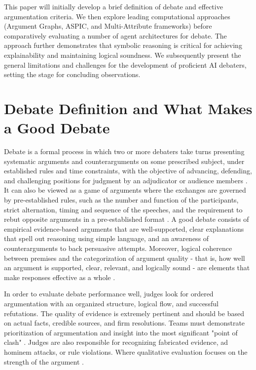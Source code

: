 \documentclass[conference]{IEEEtran}
\begin{document}
This paper will initially develop a brief definition of debate and effective argumentation criteria. We then explore leading computational approaches (Argument Graphs, ASPIC, and Multi-Attribute frameworks) before comparatively evaluating a number of agent architectures for debate. The approach further demonstrates that symbolic reasoning is critical for achieving explainability and maintaining logical soundness. We subsequently present the general limitations and challenges for the development of proficient AI debaters, setting the stage for concluding observations.

\section{Debate Definition and What Makes a Good Debate}
Debate is a formal process in which two or more debaters take turns presenting systematic arguments and counterarguments on some prescribed subject, under established rules and time constraints, with the objective of advancing, defending, and challenging positions for judgment by an adjudicator or audience members \cite{rakshit2019debbie}\cite{tan2016winning}. It can also be viewed as a game of arguments where the exchanges are governed by pre-established rules, such as the number and function of the participants, strict alternation, timing and sequence of the speeches, and the requirement to rebut opposite arguments in a pre-established format \cite{engelmann2022argumentation}. A good debate consists of empirical evidence-based arguments that are well-supported, clear explanations that spell out reasoning using simple language, and an awareness of counterarguments to back persuasive attempts. Moreover, logical coherence between premises and the categorization of argument quality - that is, how well an argument is supported, clear, relevant, and logically sound - are elements that make responses effective as a whole \cite{engelmann2022argumentation}.

In order to evaluate debate performance well, judges look for ordered argumentation with an organized structure, logical flow, and successful refutations. The quality of evidence is extremely pertinent and should be based on actual facts, credible sources, and firm resolutions. Teams must demonstrate prioritization of argumentation and insight into the most significant "point of clash" \cite{b8}. Judges are also responsible for recognizing fabricated evidence, ad hominem attacks, or rule violations. Where qualitative evaluation focuses on the strength of the argument \cite{b7}\cite{b8}.
\end{document}
